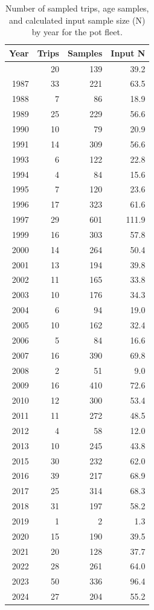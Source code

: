 \documentclass[
  english,
]{article}
\begin{document}
\begin{longtable}{rrrr}
\end{longtable}

\endgroup

\pagebreak

\begingroup
\fontsize{9.0pt}{11.0pt}\selectfont

\begin{longtable}{rrrr}

\caption{\label{tbl-pot-age-samples}Number of sampled trips, age
samples, and calculated input sample size (N) by year for the pot
fleet.}

\tabularnewline

\toprule
Year & Trips & Samples & Input N \\ 
\midrule\addlinespace[2.5pt]
1986 & 20 & 139 & 39.2 \\ 
1987 & 33 & 221 & 63.5 \\ 
1988 & 7 & 86 & 18.9 \\ 
1989 & 25 & 229 & 56.6 \\ 
1990 & 10 & 79 & 20.9 \\ 
1991 & 14 & 309 & 56.6 \\ 
1993 & 6 & 122 & 22.8 \\ 
1994 & 4 & 84 & 15.6 \\ 
1995 & 7 & 120 & 23.6 \\ 
1996 & 17 & 323 & 61.6 \\ 
1997 & 29 & 601 & 111.9 \\ 
1999 & 16 & 303 & 57.8 \\ 
2000 & 14 & 264 & 50.4 \\ 
2001 & 13 & 194 & 39.8 \\ 
2002 & 11 & 165 & 33.8 \\ 
2003 & 10 & 176 & 34.3 \\ 
2004 & 6 & 94 & 19.0 \\ 
2005 & 10 & 162 & 32.4 \\ 
2006 & 5 & 84 & 16.6 \\ 
2007 & 16 & 390 & 69.8 \\ 
2008 & 2 & 51 & 9.0 \\ 
2009 & 16 & 410 & 72.6 \\ 
2010 & 12 & 300 & 53.4 \\ 
2011 & 11 & 272 & 48.5 \\ 
2012 & 4 & 58 & 12.0 \\ 
2013 & 10 & 245 & 43.8 \\ 
2015 & 30 & 232 & 62.0 \\ 
2016 & 39 & 217 & 68.9 \\ 
2017 & 25 & 314 & 68.3 \\ 
2018 & 31 & 197 & 58.2 \\ 
2019 & 1 & 2 & 1.3 \\ 
2020 & 15 & 190 & 39.5 \\ 
2021 & 20 & 128 & 37.7 \\ 
2022 & 28 & 261 & 64.0 \\ 
2023 & 50 & 336 & 96.4 \\ 
2024 & 27 & 204 & 55.2 \\ 
\bottomrule

\end{longtable}
\end{document}
